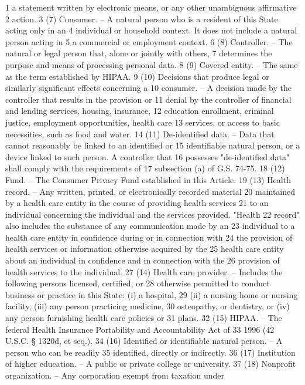 1 a statement written by electronic means, or any other unambiguous affirmative
2 action.
3 (7) Consumer. – A natural person who is a resident of this State acting only in an
4 individual or household context. It does not include a natural person acting in
5 a commercial or employment context.
6 (8) Controller. – The natural or legal person that, alone or jointly with others,
7 determines the purpose and means of processing personal data.
8 (9) Covered entity. – The same as the term established by HIPAA.
9 (10) Decisions that produce legal or similarly significant effects concerning a
10 consumer. – A decision made by the controller that results in the provision or
11 denial by the controller of financial and lending services, housing, insurance,
12 education enrollment, criminal justice, employment opportunities, health care
13 services, or access to basic necessities, such as food and water.
14 (11) De-identified data. – Data that cannot reasonably be linked to an identified or
15 identifiable natural person, or a device linked to such person. A controller that
16 possesses "de-identified data" shall comply with the requirements of
17 subsection (a) of G.S. 74-75.
18 (12) Fund. – The Consumer Privacy Fund established in this Article.
19 (13) Health record. – Any written, printed, or electronically recorded material
20 maintained by a health care entity in the course of providing health services
21 to an individual concerning the individual and the services provided. "Health
22 record" also includes the substance of any communication made by an
23 individual to a health care entity in confidence during or in connection with
24 the provision of health services or information otherwise acquired by the
25 health care entity about an individual in confidence and in connection with the
26 provision of health services to the individual.
27 (14) Health care provider. – Includes the following persons licensed, certified, or
28 otherwise permitted to conduct business or practice in this State: (i) a hospital,
29 (ii) a nursing home or nursing facility, (iii) any person practicing medicine,
30 osteopathy, or dentistry, or (iv) any person furnishing health care policies or
31 plans.
32 (15) HIPAA. – The federal Health Insurance Portability and Accountability Act of
33 1996 (42 U.S.C. § 1320d, et seq.).
34 (16) Identified or identifiable natural person. – A person who can be readily
35 identified, directly or indirectly.
36 (17) Institution of higher education. – A public or private college or university.
37 (18) Nonprofit organization. – Any corporation exempt from taxation under
